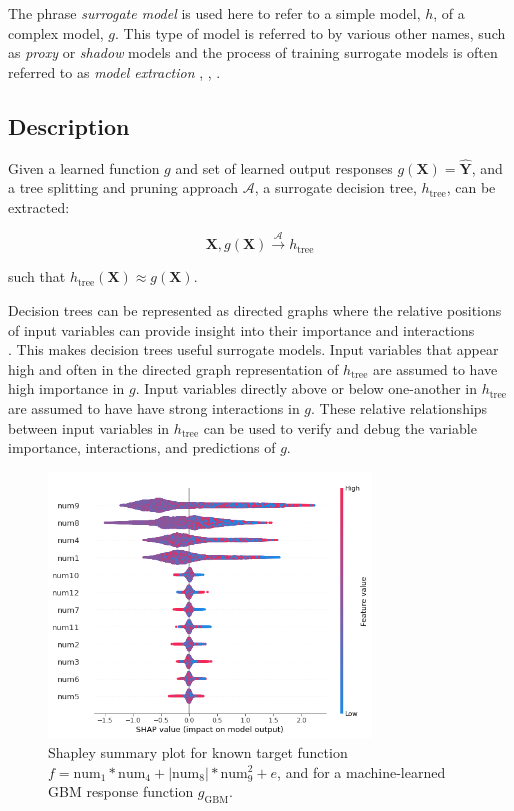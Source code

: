 \documentclass{article}
\begin{document}
The phrase \textit{surrogate model} is used here to refer to a simple model, $h$, of a complex model, $g$. This type of model is referred to by various other names, such as \textit{proxy} or \textit{shadow} models and the process of training surrogate models is often referred to as \textit{model extraction} \cite{dt_surrogate1}, \cite{ff_interpretability},  \cite{dt_surrogate2}. 

\subsection{Description}

Given a learned function $g$ and set of learned output responses $g(\mathbf{X}) = \mathbf{\hat{Y}}$, and a tree splitting and pruning approach $\mathcal{A}$, a surrogate decision tree, $h_{\text{tree}}$, can be extracted: 

\begin{equation}
\mathbf{X}, g(\mathbf{X}) \xrightarrow{\mathcal{A}} h_{\text{tree}}
\end{equation}

such that $h_{\text{tree}}(\mathbf{X}) \approx g(\mathbf{X})$. 

Decision trees can be represented as directed graphs where the relative positions of input variables can provide insight into their importance and interactions \\ \cite{cart}. This makes decision trees useful surrogate models. Input variables that appear high and often in the directed graph representation of $h_{\text{tree}}$ are assumed to have high importance in $g$. Input variables directly above or below one-another in $h_{\text{tree}}$ are assumed to have have strong interactions in $g$. These relative relationships between input variables in $h_{\text{tree}}$ can be used to verify and debug the variable importance, interactions, and predictions of $g$.

\begin{figure}
	\begin{center}
		\includegraphics[height=200pt]{img/figure_2.png}
		\caption{Shapley summary plot for known target function $f = \text{num} _1 * \text{num}_4 + |\text{num}_8| * \text{num}_9^2 + e$, and for a machine-learned GBM response function $g_{\text{GBM}}$.}
		\label{fig:global_shapley}
	\end{center}
\end{figure}
\end{document}

